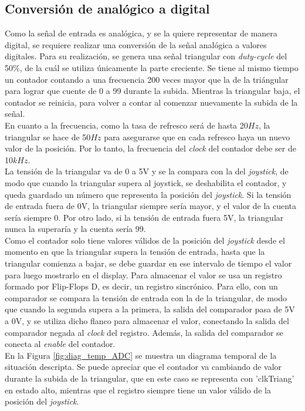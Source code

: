 \documentclass[11pt, a4paper]{article}
\begin{document}
\subsection{Conversi\'on de anal\'ogico a digital}
%
Como la señal de entrada es anal\'ogica, y se la quiere representar de manera digital, se requiere realizar una conversi\'on de la señal anal\'ogica a valores digitales. Para su realizaci\'on, se genera una se\~nal triangular con \textit{duty-cycle} del 50\%, de la cu\'al se utiliza \'unicamente la parte creciente. Se tiene al mismo tiempo un contador contando a una frecuencia 200 veces mayor que la de la tri\'angular para lograr que cuente de 0 a 99 durante la subida. Mientras la triangular baja, el contador se reinicia, para volver a contar al comenzar nuevamente la subida de la señal. \\
En cuanto a la frecuencia, como la tasa de refresco ser\'a de hasta 20$Hz$, la triangular se hace de 50$Hz$ para asegurarse que en cada refresco haya un nuevo valor de la posici\'on. Por lo tanto, la frecuencia del \textit{clock} del contador debe ser de 10$kHz$.\\
La tensi\'on de la triangular va de 0 a 5V y se la compara con la del \textit{joystick}, de modo que cuando la triangular supera al joystick, se deshabilita el contador, y queda guardado un n\'umero que representa la posici\'on del \textit{joystick}. Si la tensi\'on de entrada fuera de 0V, la triangular siempre ser\'ia mayor, y el valor de la cuenta ser\'ia siempre 0. Por otro lado, si la tensi\'on de entrada fuera 5V, la triangular nunca la superar\'ia y la cuenta ser\'ia 99. \\
Como el contador solo tiene valores v\'alidos de la posici\'on del \textit{joystick} desde el momento en que la triangular supera la tensi\'on de entrada, hasta que la triangular comienza a bajar, se debe guardar en ese intervalo de tiempo el valor para luego mostrarlo en el display. Para almacenar el valor se usa un registro formado por Flip-Flops D, es decir, un registro sincr\'onico. Para ello, con un comparador se compara la tensi\'on de entrada con la de la triangular, de modo que cuando la segunda supera a la primera, la salida del comparador pasa de 5V a 0V, y se utiliza dicho flanco para almacenar el valor, conectando la salida del comparador negada al \textit{clock} del registro. Adem\'as, la salida del comparador se conecta al \textit{enable} del contador.\\
En la Figura \ref{fig:diag_temp_ADC} se muestra un diagrama temporal de la situaci\'on descripta. Se puede apreciar que el contador va cambiando de valor durante la subida de la triangular, que en este caso se representa con 'clkTriang' en estado alto, mientras que el registro siempre tiene un valor v\'alido de la posici\'on del \textit{joystick}.
\end{document}
